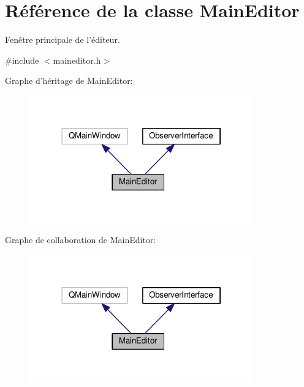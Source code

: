 \hypertarget{classMainEditor}{\section{Référence de la classe Main\+Editor}
\label{classMainEditor}
}


Fenêtre principale de l’éditeur.  




{\ttfamily \#include $<$maineditor.\+h$>$}



Graphe d'héritage de Main\+Editor\+:\nopagebreak
\begin{figure}[H]
\begin{center}
\leavevmode
\includegraphics[width=273pt]{d1/d27/classMainEditor__inherit__graph}
\end{center}
\end{figure}


Graphe de collaboration de Main\+Editor\+:\nopagebreak
\begin{figure}[H]
\begin{center}
\leavevmode
\includegraphics[width=273pt]{db/d11/classMainEditor__coll__graph}
\end{center}
\end{figure}
